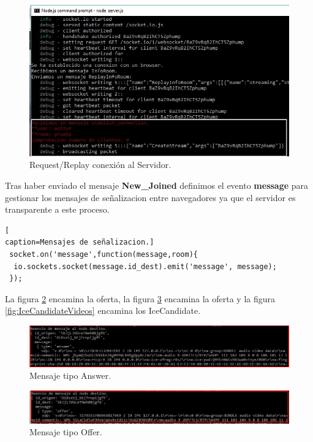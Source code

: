 \begin{figure}[!h]
\begin{center}
   \includegraphics[width=0.8\linewidth]{Figures/StablishConnectionServer}
	\decoRule
	\caption[Request/Replay conexión Servidor]{Request/Replay conexión al Servidor.}
\label{fig:EjecucionStablishConnection}
\end{center}
\end{figure}
Tras haber enviado el mensaje \textbf{New\_Joined} definimos el evento \textbf{message} para gestionar los mensajes de señalizacion entre navegadores ya que el servidor es transparente a este proceso.
\begin{lstlisting}[
caption=Mensajes de señalizacion.]
 socket.on('message',function(message,room){
  io.sockets.socket(message.id_dest).emit('message', message);
 });
\end{lstlisting}
La figura \ref{fig:AnswerServer} encamina la oferta, la figura \ref{fig:OfferServer} encamina la oferta y la figura \ref{fig:IceCandidateVideos} encamina los IceCandidate.
\begin{figure}[!h]
\begin{center}
   \includegraphics[width=0.8\linewidth]{Figures/AnswerServer}
	\decoRule
	\caption[Request/Replay conexión Servidor]{Mensaje tipo Answer.}
\label{fig:AnswerServer}
\end{center}
\end{figure}
\begin{figure}[!h]
\begin{center}
   \includegraphics[width=0.8\linewidth]{Figures/OfferServer}
	\decoRule
	\caption[Request/Replay conexión Servidor]{Mensaje tipo Offer.}
\label{fig:OfferServer}
\end{center}
\end{figure}
